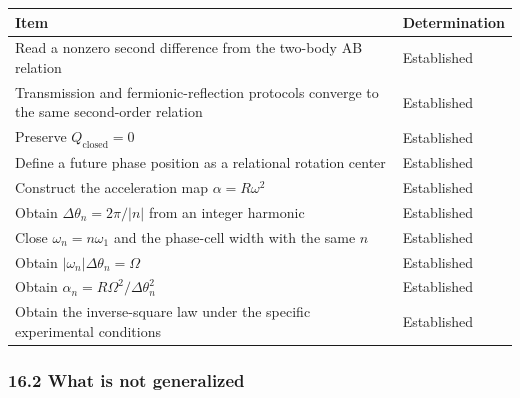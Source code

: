 \documentclass[
  a4paper,
]{article}
\newcounter{none} %
\begin{document}
{\def\LTcaptype{none} %
\begin{longtable}[]{@{}
  >{\raggedright\arraybackslash}p{}
  >{\raggedright\arraybackslash}p{}@{}}
\toprule\noalign{}
\begin{minipage}[b]{\linewidth}\raggedright
Item
\end{minipage} & \begin{minipage}[b]{\linewidth}\raggedright
Determination
\end{minipage} \\
\midrule\noalign{}
\endhead
\bottomrule\noalign{}
\endlastfoot
Read a nonzero second difference from the two-body AB relation &
Established \\
Transmission and fermionic-reflection protocols converge to the same
second-order relation & Established \\
Preserve \(Q_{\mathrm{closed}}=0\) & Established \\
Define a future phase position as a relational rotation center &
Established \\
Construct the acceleration map \(\alpha=R\omega^2\) & Established \\
Obtain \(\Delta\theta_n=2\pi/\lvert n\rvert\) from an integer harmonic &
Established \\
Close \(\omega_n=n\omega_1\) and the phase-cell width with the same
\(n\) & Established \\
Obtain \(\lvert\omega_n\rvert\Delta\theta_n=\Omega\) & Established \\
Obtain \(\alpha_n=R\Omega^2/\Delta\theta_n^2\) & Established \\
Obtain the inverse-square law under the specific experimental conditions
& Established \\
\end{longtable}
}

\subsubsection{16.2 What is not
generalized}\label{what-is-not-generalized}
\end{document}
